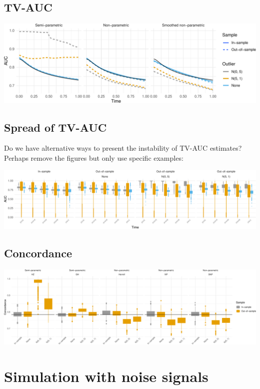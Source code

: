 \documentclass[
]{article}
\begin{document}
\hypertarget{tv-auc}{%
\subsection{TV-AUC}\label{tv-auc}}

\includegraphics{ProgressReport_files/figure-latex/fig_tv_auc_contam-1.pdf}

\hypertarget{spread-of-tv-auc}{%
\subsection{Spread of TV-AUC}\label{spread-of-tv-auc}}

Do we have alternative ways to present the instability of TV-AUC
estimates? Perhaps remove the figures but only use specific examples:

\includegraphics{ProgressReport_files/figure-latex/fig_tvauc_box_contam-1.pdf}

\hypertarget{concordance}{%
\subsection{Concordance}\label{concordance}}

\includegraphics{ProgressReport_files/figure-latex/fig_c_contam-1.pdf}

\hypertarget{simulation-with-noise-signals}{%
\section{Simulation with noise
signals}\label{simulation-with-noise-signals}}
\end{document}
